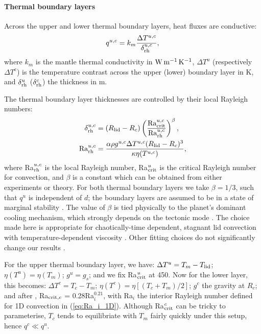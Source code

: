 \paragraph{Thermal boundary layers}

Across the upper and lower thermal boundary layers, heat fluxes are conductive:
\begin{equation}
    q^{u, c} = k_m \frac{\Delta T^{u, c}}{\delta^{u, c}_{\rm rh}}, \label{eq:q_u}
\end{equation}
where $k_m$ is the mantle thermal conductivity in $\rm{W\,m^{-1}\,K^{-1}}$, $\Delta T^u$ (respectively $\Delta T^c$) is the temperature contrast across the upper (lower) boundary layer in K, and $\delta^{u}_{\rm rh}$ ($\delta^{c}_{\rm rh}$) the thickness in m. 

The thermal boundary layer thicknesses are controlled by their local Rayleigh numbers:
\begin{align}
\delta^{u, c}_{\rm rh} &= (R_{\rm lid} - R_c) \left(\frac{{\rm Ra}^{u, c}_{{\rm crit}}}{{\rm Ra}^{u, c}_{{\rm rh}}}\right)^\beta,  \label{eq:d_u}\\ 
{\rm Ra}^{u, c}_{{\rm rh}} &= \frac{\alpha\rho g^{u, c} \Delta T^{u, c} (R_{\rm lid} - R_c)^3}{\kappa \eta(T^{u, c})}, \label{eq:Ra_rh}
\end{align}
where Ra$^{u, c}_{{\rm rh}}$ is the local Rayleigh number, Ra$^u_{{\rm crit}}$ is the critical Rayleigh number for convection, and $\beta$ is a constant which can be obtained from either experiments or theory. For both thermal boundary layers we take $\beta = 1/3$, such that $q^u$ is independent of $d$; the boundary layers are assumed to be in a state of marginal stability \citep[e.g.,][]{solomatov_scaling_1995}. The value of $\beta$ is tied physically to the planet's dominant cooling mechanism, which strongly depends on the tectonic mode \citep{lenardic_diversity_2018, seales_uncertainty_2020}. The choice made here is appropriate for chaotically-time dependent, stagnant lid convection with temperature-dependent viscosity \citep{solomatov_scaling_1995, solomatov_scaling_2000}. Other fitting choices do not significantly change our results \citep{thiriet_scaling_2019}.  %

For the upper thermal boundary layer, we have: $\Delta T^u = T_m - T_{\rm lid}$; $\eta(T^u) = \eta(T_m)$; $g^u = g_s$; and we fix Ra$^u_{{\rm crit}}$ at 450. Now for the lower layer, this becomes: $\Delta T^c = T_c - T_m$; $\eta(T^c) = \eta[(T_c + T_m)/2]$; $g^c$ the gravity at $R_c$; and after \citet{deschamps_inversion_2000}, Ra$_{{\rm crit}, c}$ = 0.28Ra$_i^{0.21}$, with Ra$_i$ the interior Rayleigh number defined for 1D convection in (\ref{eq:Ra_i_1D}). Although Ra$_{\rm crit}^{c}$ can be tricky to parameterise, $T_c$ tends to equilibriate with $T_m$ fairly quickly under this setup, hence $q^c \ll q^u$.

